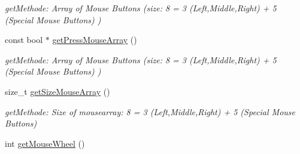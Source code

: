 \begin{DoxyCompactItemize}
\begin{DoxyCompactList}\small\item\em getMethode: Array of Mouse Buttons (size: 8 = 3 (Left,Middle,Right) + 5 (Special Mouse Buttons) ) \item\end{DoxyCompactList}\item 
\hypertarget{class_f2_c_1_1_input_a3c484a5be1a1295a4e6af542512471f5}{
const bool $\ast$ \hyperlink{class_f2_c_1_1_input_a3c484a5be1a1295a4e6af542512471f5}{getPressMouseArray} ()}
\label{class_f2_c_1_1_input_a3c484a5be1a1295a4e6af542512471f5}

\begin{DoxyCompactList}\small\item\em getMethode: Array of Mouse Buttons (size: 8 = 3 (Left,Middle,Right) + 5 (Special Mouse Buttons) ) \item\end{DoxyCompactList}\item 
\hypertarget{class_f2_c_1_1_input_a65c3486d1d7c2b97ae9d70ede9c8ba35}{
size\_\-t \hyperlink{class_f2_c_1_1_input_a65c3486d1d7c2b97ae9d70ede9c8ba35}{getSizeMouseArray} ()}
\label{class_f2_c_1_1_input_a65c3486d1d7c2b97ae9d70ede9c8ba35}

\begin{DoxyCompactList}\small\item\em getMethode: Size of mousearray: 8 = 3 (Left,Middle,Right) + 5 (Special Mouse Buttons) \item\end{DoxyCompactList}\item 
\hypertarget{class_f2_c_1_1_input_ad5735b5ece3cb4647543261fdca31f25}{
int \hyperlink{class_f2_c_1_1_input_ad5735b5ece3cb4647543261fdca31f25}{getMouseWheel} ()}
\label{class_f2_c_1_1_input_ad5735b5ece3cb4647543261fdca31f25}


\end{DoxyCompactItemize}
